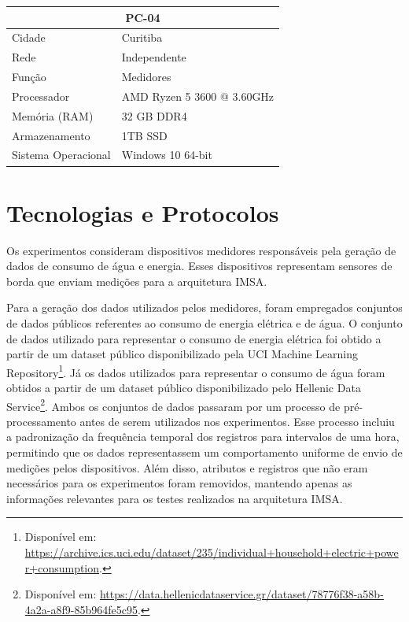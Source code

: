 \begin{table}[htb]
\begin{tabular}{|l|l|}
        \multicolumn{2}{|c|}{\textbf{PC-04}} \\
        \hline
            Cidade & Curitiba \\
        \hline
            Rede & Independente \\
        \hline
            Função & Medidores \\
        \hline
            Processador & AMD Ryzen 5 3600 @ 3.60GHz \\
        \hline
            Memória (\gls{RAM}) & 32 GB DDR4 \\
        \hline
            Armazenamento & 1TB \gls{SSD} \\
        \hline
            Sistema Operacional & Windows 10 64-bit \\
        \hline
    \end{tabular}
\end{table}

\section{Tecnologias e Protocolos}

Os experimentos consideram dispositivos medidores responsáveis pela geração de dados de consumo de água e energia. Esses dispositivos representam sensores de borda que enviam medições para a arquitetura \gls{IMSA}.

Para a geração dos dados utilizados pelos medidores, foram empregados conjuntos de dados públicos referentes ao consumo de energia elétrica e de água. O conjunto de dados utilizado para representar o consumo de energia elétrica foi obtido a partir de um dataset público disponibilizado pela UCI Machine Learning Repository\footnote{Disponível em: \url{https://archive.ics.uci.edu/dataset/235/individual+household+electric+power+consumption}.}. Já os dados utilizados para representar o consumo de água foram obtidos a partir de um dataset público disponibilizado pelo Hellenic Data Service\footnote{Disponível em: \url{https://data.hellenicdataservice.gr/dataset/78776f38-a58b-4a2a-a8f9-85b964fe5c95}.}. Ambos os conjuntos de dados passaram por um processo de pré-processamento antes de serem utilizados nos experimentos. Esse processo incluiu a padronização da frequência temporal dos registros para intervalos de uma hora, permitindo que os dados representassem um comportamento uniforme de envio de medições pelos dispositivos. Além disso, atributos e registros que não eram necessários para os experimentos foram removidos, mantendo apenas as informações relevantes para os testes realizados na arquitetura \gls{IMSA}.

